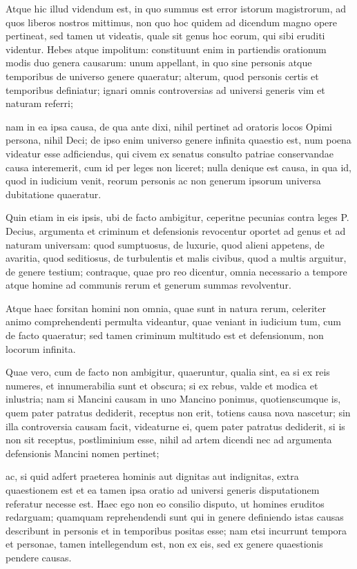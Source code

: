  Atque hic illud videndum est, in quo summus est error istorum magistrorum, ad quos liberos nostros mittimus, non quo hoc quidem ad dicendum magno opere pertineat, sed tamen ut videatis, quale sit genus hoc eorum, qui sibi eruditi videntur. Hebes atque impolitum: constituunt enim in partiendis orationum modis duo genera causarum: unum appellant, in quo sine personis atque temporibus de universo genere quaeratur; alterum, quod personis certis et temporibus definiatur; ignari omnis controversias ad universi generis vim et naturam referri;

 nam in ea ipsa causa, de qua ante dixi, nihil pertinet ad oratoris locos Opimi persona, nihil Deci; de ipso enim universo genere infinita quaestio est, num poena videatur esse adficiendus, qui civem ex senatus consulto patriae conservandae causa interemerit, cum id per leges non liceret; nulla denique est causa, in qua id, quod in iudicium venit, reorum personis ac non generum ipsorum universa dubitatione quaeratur.

 Quin etiam in eis ipsis, ubi de facto ambigitur, ceperitne pecunias contra leges P. Decius, argumenta et criminum et defensionis revocentur oportet ad genus et ad naturam universam: quod sumptuosus, de luxurie, quod alieni appetens, de avaritia, quod seditiosus, de turbulentis et malis civibus, quod a multis arguitur, de genere testium; contraque, quae pro reo dicentur, omnia necessario a tempore atque homine ad communis rerum et generum summas revolventur.

 Atque haec forsitan homini non omnia, quae sunt in natura rerum, celeriter animo comprehendenti permulta videantur, quae veniant in iudicium tum, cum de facto quaeratur; sed tamen criminum multitudo est et defensionum, non locorum infinita.

 Quae vero, cum de facto non ambigitur, quaeruntur, qualia sint, ea si ex reis numeres, et innumerabilia sunt et obscura; si ex rebus, valde et modica et inlustria; nam si Mancini causam in uno Mancino ponimus, quotienscumque is, quem pater patratus dediderit, receptus non erit, totiens causa nova nascetur; sin illa controversia causam facit, videaturne ei, quem pater patratus dediderit, si is non sit receptus, postliminium esse, nihil ad artem dicendi nec ad argumenta defensionis Mancini nomen pertinet;

 ac, si quid adfert praeterea hominis aut dignitas aut indignitas, extra quaestionem est et ea tamen ipsa oratio ad universi generis disputationem referatur necesse est. Haec ego non eo consilio disputo, ut homines eruditos redarguam; quamquam reprehendendi sunt qui in genere definiendo istas causas describunt in personis et in temporibus positas esse; nam etsi incurrunt tempora et personae, tamen intellegendum est, non ex eis, sed ex genere quaestionis pendere causas.

